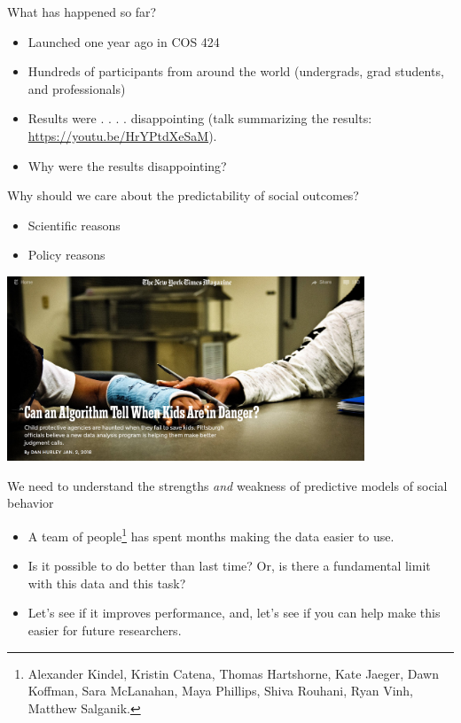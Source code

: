 \documentclass{beamer}
\begin{document}
\begin{frame}

What has happened so far?\\ \pause
\begin{itemize}
\item Launched one year ago in COS 424 \pause
\item Hundreds of participants from around the world (undergrads, grad students, and professionals) \pause
\item Results were . . . . disappointing (talk summarizing the results: \textcolor{blue}{\url{https://youtu.be/HrYPtdXeSaM}}). \pause
\item Why were the results disappointing?
\end{itemize}

\end{frame}
\begin{frame}

Why should we care about the predictability of social outcomes?
\begin{itemize}
\item Scientific reasons \pause
\item Policy reasons
\end{itemize}

\begin{center}
\includegraphics[width=0.8\textwidth]{figures/hurley_can_2018_title}
\end{center}

\vfill

We need to understand the strengths \emph{and} weakness of predictive models of social behavior
\end{frame}
\begin{frame}

\begin{itemize}
\item A team of people\footnote{Alexander Kindel, Kristin Catena, Thomas Hartshorne, Kate Jaeger, Dawn Koffman, Sara McLanahan, Maya Phillips, Shiva Rouhani, Ryan Vinh, Matthew Salganik.} has spent months making the data easier to use. \pause
\item Is it possible to do better than last time? Or, is there a fundamental limit with this data and this task? \pause
\item Let's see if it improves performance, \pause and, let's see if you can help make this easier for future researchers.
\end{itemize}

\end{frame}
\end{document}
